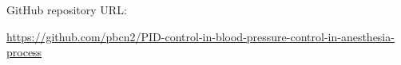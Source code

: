 \documentclass{thuemp}
\begin{document}
GitHub repository URL: 

\href{https://github.com/pbcn2/PID-control-in-blood-pressure-control-in-anesthesia-process}{https://github.com/pbcn2/PID-control-in-blood-pressure-control-in-anesthesia-process}


\renewcommand\refname{\heiti\wuhao\centerline{参考文献}\global\def\refname{参考文献}}
\vskip 12pt

\let\OLDthebibliography\thebibliography
\renewcommand\thebibliography[1]{
  \OLDthebibliography{#1}
  \setlength{\parskip}{0pt}
  \setlength{\itemsep}{0pt plus 0.3ex}
}

{
\renewcommand{\baselinestretch}{0.9}
\liuhao


}
\end{document}

